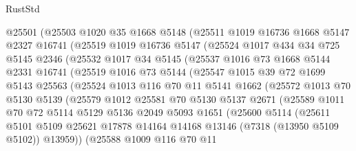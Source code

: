 \begin{lexlean}{RustStd}
\begin{coremodule}
      @25501
      (@25503
        @1020
        @35
        @1668
        @5148
        (@25511
          @1019
          @16736
          @1668
          @5147
          @2327
          @16741
          (@25519
            @1019
            @16736
            @5147
            (@25524
              @1017
              @434
              @34
              @725
              @5145
              @2346
              (@25532
                @1017
                @34
                @5145
                (@25537
                  @1016
                  @73
                  @1668
                  @5144
                  @2331
                  @16741
                  (@25519
                    @1016
                    @73
                    @5144
                    (@25547
                      @1015
                      @39
                      @72
                      @1699
                      @5143
                      @25563
                      (@25524
                        @1013
                        @116
                        @70
                        @11
                        @5141
                        @1662
                        (@25572
                          @1013
                          @70
                          @5130
                          @5139
                          (@25579
                            @1012
                            @25581
                            @70
                            @5130
                            @5137
                            @2671
                            (@25589
                              @1011
                              @70
                              @72
                              @5114
                              @5129
                              @5136
                              @2049
                              @5093
                              @1651
                              (@25600
                                @5114
                                (@25611
                                  @5101
                                  @5109
                                  @25621
                                  @17878
                                  @14164
                                  @14168
                                  @13146
                                  (@7318 (@13950 @5109 @5102))
                                  @13959))
                              (@25588
                                @1009
                                @116
                                @70
                                @11

\end{coremodule}
\end{lexlean}
